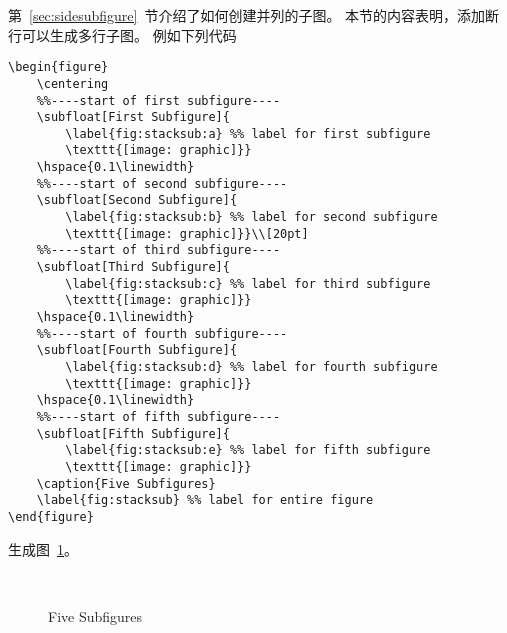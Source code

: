 第~\ref{sec:sidesubfigure}~节介绍了如何创建并列的子图。
本节的内容表明，添加断行可以生成多行子图。
例如下列代码
\begin{lstlisting}
\begin{figure}
	\centering
	%%----start of first subfigure----
	\subfloat[First Subfigure]{
		\label{fig:stacksub:a} %% label for first subfigure
		\texttt{[image: graphic]}}
	\hspace{0.1\linewidth}
	%%----start of second subfigure----
	\subfloat[Second Subfigure]{
		\label{fig:stacksub:b} %% label for second subfigure
		\texttt{[image: graphic]}}\\[20pt]
	%%----start of third subfigure----
	\subfloat[Third Subfigure]{
		\label{fig:stacksub:c} %% label for third subfigure
		\texttt{[image: graphic]}}
	\hspace{0.1\linewidth}
	%%----start of fourth subfigure----
	\subfloat[Fourth Subfigure]{
		\label{fig:stacksub:d} %% label for fourth subfigure
		\texttt{[image: graphic]}}
	\hspace{0.1\linewidth}
	%%----start of fifth subfigure----
	\subfloat[Fifth Subfigure]{
		\label{fig:stacksub:e} %% label for fifth subfigure
		\texttt{[image: graphic]}}
	\caption{Five Subfigures}
	\label{fig:stacksub} %% label for entire figure
\end{figure}
\end{lstlisting}
生成图~\ref{fig:stacksub}。

\begin{figure}
	\centering
	\hspace{0.1\linewidth}
	\\[20pt]
	\hspace{0.1\linewidth}
	\hspace{0.1\linewidth}
	\caption{Five Subfigures}
	\label{fig:stacksub} %
\end{figure}



